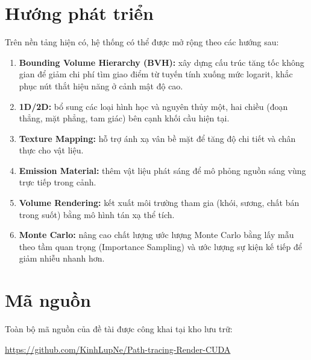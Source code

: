 \section{Hướng phát triển}
Trên nền tảng hiện có, hệ thống có thể được mở rộng theo các hướng sau:
\begin{enumerate}[noitemsep]
  \item \textbf{Bounding Volume Hierarchy (BVH):} xây dựng cấu trúc tăng tốc
        không gian để giảm chi phí tìm giao điểm từ tuyến tính xuống mức
        logarit, khắc phục nút thắt hiệu năng ở cảnh mật độ cao.
  \item \textbf{1D/2D:} bổ sung các loại hình học và nguyên thủy một, hai chiều
        (đoạn thẳng, mặt phẳng, tam giác) bên cạnh khối cầu hiện tại.
  \item \textbf{Texture Mapping:} hỗ trợ ánh xạ vân bề mặt để tăng độ chi tiết
        và chân thực cho vật liệu.
  \item \textbf{Emission Material:} thêm vật liệu phát sáng để mô phỏng nguồn
        sáng vùng trực tiếp trong cảnh.
  \item \textbf{Volume Rendering:} kết xuất môi trường tham gia (khói, sương,
        chất bán trong suốt) bằng mô hình tán xạ thể tích.
  \item \textbf{Monte Carlo:} nâng cao chất lượng ước lượng Monte Carlo bằng lấy
        mẫu theo tầm quan trọng (Importance Sampling) và ước lượng sự kiện kế
        tiếp để giảm nhiễu nhanh hơn.
\end{enumerate}

\section{Mã nguồn}
Toàn bộ mã nguồn của đề tài được công khai tại kho lưu trữ:
\begin{center}
\url{https://github.com/KinhLupNe/Path-tracing-Render-CUDA}
\end{center}
